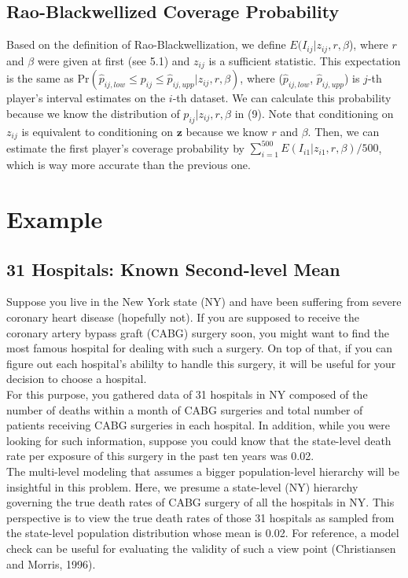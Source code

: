 \documentclass[article]{jss}
\begin{document}
\subsection{Rao-Blackwellized Coverage Probability}
Based on the definition of Rao-Blackwellization, we define $E(I_{ij}\vert z_{ij}, r, \beta$), where $r$ and $\beta$ were given at first (see 5.1) and $z_{ij}$ is a sufficient statistic. This expectation is the same as Pr$(\hat{p}_{ij, low}\le p_{ij} \le\hat{p}_{ij, upp}\vert z_{ij}, r, \beta)$, where ($\hat{p}_{ij, low}$, $\hat{p}_{ij, upp}$) is $j$-th player's interval estimates on the $i$-th dataset. We can calculate this probability  because we know the distribution of $p_{ij} \vert z_{ij}, r, \beta$ in (9). Note that conditioning on $z_{ij}$ is equivalent to conditioning on $\mathbf{z}$ because we know $r$ and $\beta$. Then, we can estimate the first player's coverage probability by $\sum_{i=1}^{500}E(I_{i1}\vert z_{i1}, r, \beta)/500$, which is way more accurate than the previous one.
\section[Example]{Example}
\subsection[Known Second-level Mean]{31 Hospitals: Known Second-level Mean}
Suppose you live in the New York state (NY) and have been suffering from severe coronary heart disease (hopefully not). If you are supposed to receive the coronary artery bypass graft (CABG) surgery soon, you might want to find the most famous hospital for dealing with such a surgery. On top of that, if you can figure out each hospital's abililty to handle this surgery, it will be useful for your decision to choose a hospital.
\\

For this purpose, you gathered data of 31 hospitals in NY composed of the number of deaths within a month of CABG surgeries and total number of patients receiving CABG surgeries in each hospital. In addition, while you were looking for such information, suppose you could know that the  state-level death rate per exposure of this surgery in the past ten years was 0.02. 
\\

The multi-level modeling that assumes a bigger population-level hierarchy will be insightful in this problem. Here, we presume a state-level (NY) hierarchy governing the true death rates of CABG surgery of all the hospitals in NY. This perspective is to view the true death rates of those 31 hospitals as sampled from the state-level population distribution whose mean is 0.02. For reference, a model check can be useful for evaluating the validity of such a view point (Christiansen and Morris, 1996). 
\\
\end{document}
